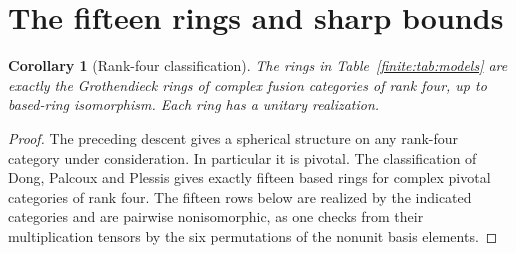\documentclass[11pt,a4paper]{article}
\newtheorem{corollary}[theorem]{Corollary}
\theoremstyle{definition}\newtheorem{definition}[theorem]{Definition}
\theoremstyle{remark}\newtheorem{remark}[theorem]{Remark}
\numberwithin{equation}{section}
\begin{document}
\section{The fifteen rings and sharp bounds}\label{finite:sec:catalog}
\begin{corollary}[Rank-four classification]\label{finite:cor:classification}
The rings in Table~\ref{finite:tab:models} are exactly the Grothendieck
rings of complex fusion categories of rank four, up to based-ring
isomorphism. Each ring has a unitary realization.
\end{corollary}
\begin{proof}
The preceding descent gives a spherical structure on any rank-four category
under consideration. In particular it is pivotal. The classification of
Dong, Palcoux and Plessis \cite[Theorem~1.1 and Table~1]{DPP} gives exactly fifteen based rings
for complex pivotal categories of rank four. The fifteen rows below are
realized by the indicated categories and are pairwise nonisomorphic, as
one checks from their multiplication tensors by the six permutations of
the nonunit basis elements.
\end{proof}
\end{document}
